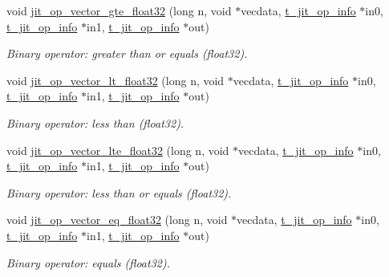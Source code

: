 \begin{DoxyCompactItemize}
void \hyperlink{group__opvecmod_ga7d05b7545d222540949003a22fdb60c4}{jit\_\-op\_\-vector\_\-gte\_\-float32} (long n, void $\ast$vecdata, \hyperlink{structt__jit__op__info}{t\_\-jit\_\-op\_\-info} $\ast$in0, \hyperlink{structt__jit__op__info}{t\_\-jit\_\-op\_\-info} $\ast$in1, \hyperlink{structt__jit__op__info}{t\_\-jit\_\-op\_\-info} $\ast$out)
\begin{DoxyCompactList}\small\item\em Binary operator: greater than or equals (float32). \item\end{DoxyCompactList}\item 
void \hyperlink{group__opvecmod_ga230643676f4cda9a87d8a47d8a8c23a9}{jit\_\-op\_\-vector\_\-lt\_\-float32} (long n, void $\ast$vecdata, \hyperlink{structt__jit__op__info}{t\_\-jit\_\-op\_\-info} $\ast$in0, \hyperlink{structt__jit__op__info}{t\_\-jit\_\-op\_\-info} $\ast$in1, \hyperlink{structt__jit__op__info}{t\_\-jit\_\-op\_\-info} $\ast$out)
\begin{DoxyCompactList}\small\item\em Binary operator: less than (float32). \item\end{DoxyCompactList}\item 
void \hyperlink{group__opvecmod_gad88b412468d3d4962b1bfcef9c1e6a18}{jit\_\-op\_\-vector\_\-lte\_\-float32} (long n, void $\ast$vecdata, \hyperlink{structt__jit__op__info}{t\_\-jit\_\-op\_\-info} $\ast$in0, \hyperlink{structt__jit__op__info}{t\_\-jit\_\-op\_\-info} $\ast$in1, \hyperlink{structt__jit__op__info}{t\_\-jit\_\-op\_\-info} $\ast$out)
\begin{DoxyCompactList}\small\item\em Binary operator: less than or equals (float32). \item\end{DoxyCompactList}\item 
void \hyperlink{group__opvecmod_ga606351534a911aea16e44faa411f2e01}{jit\_\-op\_\-vector\_\-eq\_\-float32} (long n, void $\ast$vecdata, \hyperlink{structt__jit__op__info}{t\_\-jit\_\-op\_\-info} $\ast$in0, \hyperlink{structt__jit__op__info}{t\_\-jit\_\-op\_\-info} $\ast$in1, \hyperlink{structt__jit__op__info}{t\_\-jit\_\-op\_\-info} $\ast$out)
\begin{DoxyCompactList}\small\item\em Binary operator: equals (float32). \item\end{DoxyCompactList}\item 

\end{DoxyCompactItemize}
